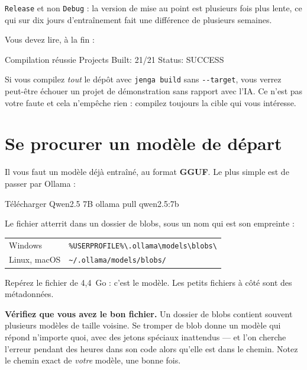 \texttt{Release} et non \texttt{Debug} : la version de mise au point est
plusieurs fois plus lente, ce qui sur dix jours d'entraînement fait une
différence de plusieurs semaines.

Vous devez lire, à la fin :

\begin{nkcode}[]{Compilation réussie}
Projects Built:  21/21
Status:          SUCCESS
\end{nkcode}

\begin{nkpiege}
Si vous compilez \emph{tout} le dépôt avec \texttt{jenga build} sans
\texttt{-{}-target}, vous verrez peut-être échouer un projet de démonstration
sans rapport avec l'IA. Ce n'est pas votre faute et cela n'empêche rien :
compilez toujours la cible qui vous intéresse.
\end{nkpiege}

\section{Se procurer un modèle de départ}

Il vous faut un modèle déjà entraîné, au format \textbf{GGUF}. Le plus simple
est de passer par Ollama :

\begin{nkcode}[]{Télécharger Qwen2.5 7B}
ollama pull qwen2.5:7b
\end{nkcode}

Le fichier atterrit dans un dossier de blobs, sous un nom qui est son empreinte :

\begin{center}
\begin{tabular}{lp{8.6cm}}
\toprule
Windows & \texttt{\%USERPROFILE\%\textbackslash.ollama\textbackslash models\textbackslash blobs\textbackslash} \\
Linux, macOS & \texttt{\textasciitilde/.ollama/models/blobs/} \\
\bottomrule
\end{tabular}
\end{center}

Repérez le fichier de 4,4~Go : c'est le modèle. Les petits fichiers à côté sont
des métadonnées.

\begin{nkpiege}
\textbf{Vérifiez que vous avez le bon fichier.} Un dossier de blobs contient
souvent plusieurs modèles de taille voisine. Se tromper de blob donne un modèle
qui répond n'importe quoi, avec des jetons spéciaux inattendus — et l'on cherche
l'erreur pendant des heures dans son code alors qu'elle est dans le chemin.
Notez le chemin exact de \emph{votre} modèle, une bonne fois.
\end{nkpiege}

